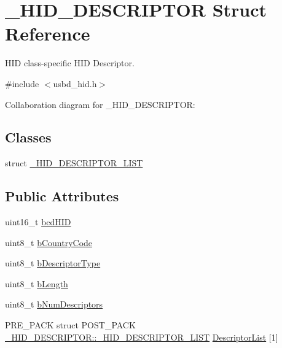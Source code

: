 \hypertarget{struct__HID__DESCRIPTOR}{}\section{\+\_\+\+H\+I\+D\+\_\+\+D\+E\+S\+C\+R\+I\+P\+T\+OR Struct Reference}
\label{struct__HID__DESCRIPTOR}


H\+ID class-\/specific H\+ID Descriptor.  




{\ttfamily \#include $<$usbd\+\_\+hid.\+h$>$}



Collaboration diagram for \+\_\+\+H\+I\+D\+\_\+\+D\+E\+S\+C\+R\+I\+P\+T\+OR\+:
\subsection*{Classes}
\begin{DoxyCompactItemize}
\item 
struct \hyperlink{struct__HID__DESCRIPTOR_1_1__HID__DESCRIPTOR__LIST}{\+\_\+\+H\+I\+D\+\_\+\+D\+E\+S\+C\+R\+I\+P\+T\+O\+R\+\_\+\+L\+I\+ST}
\end{DoxyCompactItemize}
\subsection*{Public Attributes}
\begin{DoxyCompactItemize}
\item 
uint16\+\_\+t \hyperlink{struct__HID__DESCRIPTOR_acb02b2afae4c474d60d3ce5ea90d6b3d}{bcd\+H\+ID}
\item 
uint8\+\_\+t \hyperlink{struct__HID__DESCRIPTOR_a6d494d09bf37ea067da3a089f0c966ba}{b\+Country\+Code}
\item 
uint8\+\_\+t \hyperlink{struct__HID__DESCRIPTOR_a212247b88d45fcb74da281192f9d4d02}{b\+Descriptor\+Type}
\item 
uint8\+\_\+t \hyperlink{struct__HID__DESCRIPTOR_abec52caed8ae7c6265e6aa9fccfec729}{b\+Length}
\item 
uint8\+\_\+t \hyperlink{struct__HID__DESCRIPTOR_a9613890e6d0ae78428807a72beb64d74}{b\+Num\+Descriptors}
\item 
P\+R\+E\+\_\+\+P\+A\+CK struct P\+O\+S\+T\+\_\+\+P\+A\+CK \hyperlink{struct__HID__DESCRIPTOR_1_1__HID__DESCRIPTOR__LIST}{\+\_\+\+H\+I\+D\+\_\+\+D\+E\+S\+C\+R\+I\+P\+T\+O\+R\+::\+\_\+\+H\+I\+D\+\_\+\+D\+E\+S\+C\+R\+I\+P\+T\+O\+R\+\_\+\+L\+I\+ST} \hyperlink{struct__HID__DESCRIPTOR_ab147b0fb12a4d62db59bb05846a48161}{Descriptor\+List} \mbox{[}1\mbox{]}
\end{DoxyCompactItemize}


